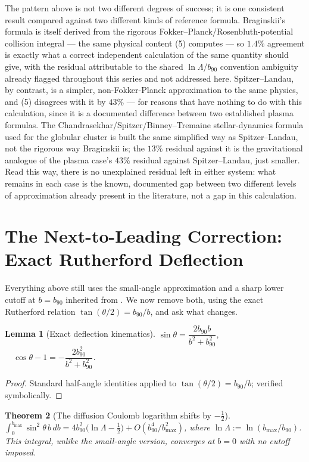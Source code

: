 \documentclass[12pt]{amsart}
\theoremstyle{plain}
\newtheorem{theorem}{Theorem}[section]
\newtheorem{lemma}[theorem]{Lemma}
\theoremstyle{remark}
\begin{document}
The pattern above is not two different degrees of success; it is one consistent result compared against two different kinds of reference formula. Braginskii's formula \cite{Braginskii1965} is itself derived from the rigorous Fokker--Planck/Rosenbluth-potential collision integral --- the same physical content (5) computes --- so $1.4\%$ agreement is exactly what a correct independent calculation of the same quantity should give, with the residual attributable to the shared $\ln\Lambda$/$b_{90}$ convention ambiguity already flagged throughout this series and not addressed here. Spitzer--Landau, by contrast, is a simpler, non-Fokker-Planck approximation to the same physics, and (5) disagrees with it by $43\%$ --- for reasons that have nothing to do with this calculation, since it is a documented difference between two established plasma formulas. The Chandrasekhar/Spitzer/Binney--Tremaine stellar-dynamics formula used for the globular cluster is built the same simplified way as Spitzer--Landau, not the rigorous way Braginskii is; the $13\%$ residual against it is the gravitational analogue of the plasma case's $43\%$ residual against Spitzer--Landau, just smaller. Read this way, there is no unexplained residual left in either system: what remains in each case is the known, documented gap between two different levels of approximation already present in the literature, not a gap in this calculation.

\section{The Next-to-Leading Correction: Exact Rutherford Deflection}

Everything above still uses the small-angle approximation and a sharp lower cutoff at $b=b_{90}$ inherited from \cite{Ebert2026Bath}. We now remove both, using the exact Rutherford relation $\tan(\theta/2)=b_{90}/b$, and ask what changes.

\begin{lemma}[Exact deflection kinematics]\label{lem:exact}
$\sin\theta = \dfrac{2b_{90}b}{b^2+b_{90}^2}$, $\quad\cos\theta-1 = -\dfrac{2b_{90}^2}{b^2+b_{90}^2}$.
\end{lemma}

\begin{proof}
Standard half-angle identities applied to $\tan(\theta/2)=b_{90}/b$; verified symbolically.
\end{proof}

\begin{theorem}[The diffusion Coulomb logarithm shifts by $-\tfrac12$]\label{thm:shift}
$\displaystyle\int_0^{b_{\max}}\sin^2\theta\,b\,db = 4b_{90}^2\Big(\ln\Lambda-\tfrac12\Big) + O(b_{90}^4/b_{\max}^2)$, where $\ln\Lambda:=\ln(b_{\max}/b_{90})$. This integral, unlike the small-angle version, converges at $b=0$ with no cutoff imposed.
\end{theorem}
\end{document}
